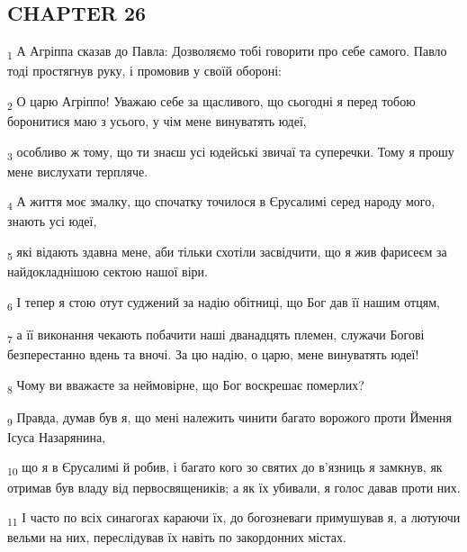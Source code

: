 \subsection{CHAPTER 26}
\begin{tcolorbox}
\textsubscript{1} А Агріппа сказав до Павла: Дозволяємо тобі говорити про себе самого. Павло тоді простягнув руку, і промовив у своїй обороні:
\end{tcolorbox}
\begin{tcolorbox}
\textsubscript{2} О царю Агріппо! Уважаю себе за щасливого, що сьогодні я перед тобою боронитися маю з усього, у чім мене винуватять юдеї,
\end{tcolorbox}
\begin{tcolorbox}
\textsubscript{3} особливо ж тому, що ти знаєш усі юдейські звичаї та суперечки. Тому я прошу мене вислухати терпляче.
\end{tcolorbox}
\begin{tcolorbox}
\textsubscript{4} А життя моє змалку, що спочатку точилося в Єрусалимі серед народу мого, знають усі юдеї,
\end{tcolorbox}
\begin{tcolorbox}
\textsubscript{5} які відають здавна мене, аби тільки схотіли засвідчити, що я жив фарисеєм за найдокладнішою сектою нашої віри.
\end{tcolorbox}
\begin{tcolorbox}
\textsubscript{6} І тепер я стою отут суджений за надію обітниці, що Бог дав її нашим отцям,
\end{tcolorbox}
\begin{tcolorbox}
\textsubscript{7} а її виконання чекають побачити наші дванадцять племен, служачи Богові безперестанно вдень та вночі. За цю надію, о царю, мене винуватять юдеї!
\end{tcolorbox}
\begin{tcolorbox}
\textsubscript{8} Чому ви вважаєте за неймовірне, що Бог воскрешає померлих?
\end{tcolorbox}
\begin{tcolorbox}
\textsubscript{9} Правда, думав був я, що мені належить чинити багато ворожого проти Ймення Ісуса Назарянина,
\end{tcolorbox}
\begin{tcolorbox}
\textsubscript{10} що я в Єрусалимі й робив, і багато кого зо святих до в'язниць я замкнув, як отримав був владу від первосвящеників; а як їх убивали, я голос давав проти них.
\end{tcolorbox}
\begin{tcolorbox}
\textsubscript{11} І часто по всіх синагогах караючи їх, до богозневаги примушував я, а лютуючи вельми на них, переслідував їх навіть по закордонних містах.
\end{tcolorbox}
